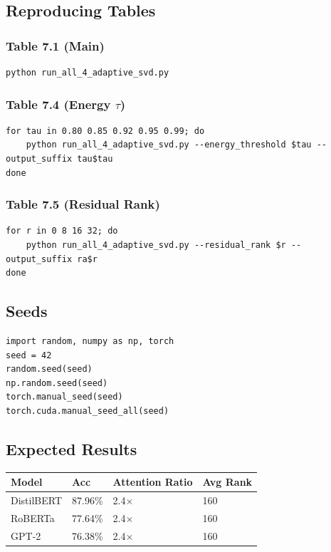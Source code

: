 \subsection{Reproducing Tables}

\subsubsection{Table 7.1 (Main)}
\begin{lstlisting}
python run_all_4_adaptive_svd.py
\end{lstlisting}

\subsubsection{Table 7.4 (Energy $\tau$)}
\begin{lstlisting}
for tau in 0.80 0.85 0.92 0.95 0.99; do
    python run_all_4_adaptive_svd.py --energy_threshold $tau --output_suffix tau$tau
done
\end{lstlisting}

\subsubsection{Table 7.5 (Residual Rank)}
\begin{lstlisting}
for r in 0 8 16 32; do
    python run_all_4_adaptive_svd.py --residual_rank $r --output_suffix ra$r
done
\end{lstlisting}

\subsection{Seeds}

\begin{lstlisting}
import random, numpy as np, torch
seed = 42
random.seed(seed)
np.random.seed(seed)
torch.manual_seed(seed)
torch.cuda.manual_seed_all(seed)
\end{lstlisting}

\subsection{Expected Results}

\begin{table}[H]
\centering
\small
\begin{tabular}{llll}
\toprule
\textbf{Model} & \textbf{Acc} & \textbf{Attention Ratio} & \textbf{Avg Rank} \\
\midrule
DistilBERT & 87.96\% & 2.4$\times$ & 160 \\
RoBERTa & 77.64\% & 2.4$\times$ & 160 \\
GPT-2 & 76.38\% & 2.4$\times$ & 160 \\
\bottomrule
\end{tabular}
\end{table}

